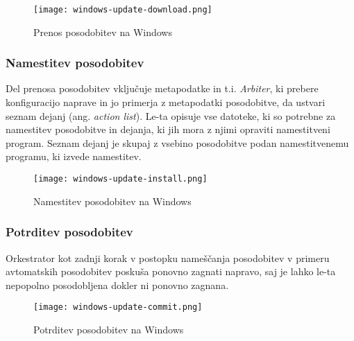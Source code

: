 \begin{figure}[H]
    \centering
    \texttt{[image: windows-update-download.png]}
    \caption{Prenos posodobitev na Windows \cite{windows-update}}
\end{figure}

\subsubsection{Namestitev posodobitev}

Del prenosa posodobitev vključuje metapodatke in t.i. \emph{Arbiter}, ki prebere konfiguracijo naprave in jo primerja
z metapodatki posodobitve, da ustvari seznam dejanj (ang. \emph{action list}).
Le-ta opisuje vse datoteke, ki so potrebne za namestitev posodobitve in dejanja, ki jih mora z njimi opraviti
namestitveni program.
Seznam dejanj je skupaj z vsebino posodobitve podan namestitvenemu programu, ki izvede namestitev.

\begin{figure}[H]
    \centering
    \texttt{[image: windows-update-install.png]}
    \caption{Namestitev posodobitev na Windows \cite{windows-update}}
\end{figure}

\subsubsection{Potrditev posodobitev}

Orkestrator kot zadnji korak v postopku nameščanja posodobitev v primeru avtomatskih posodobitev poskuša ponovno
zagnati napravo, saj je lahko le-ta nepopolno posodobljena dokler ni ponovno zagnana.

\begin{figure}[H]
    \centering
    \texttt{[image: windows-update-commit.png]}
    \caption{Potrditev posodobitev na Windows \cite{windows-update}}
\end{figure}